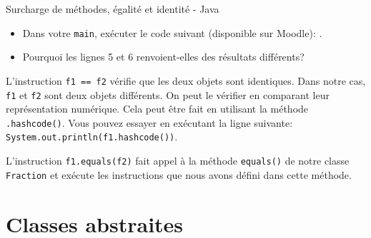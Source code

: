 \begin{Exercice}[30 minutes]{Surcharge de méthodes, égalité et identité - Java}
\begin{itemize}
	\begin{conseil}
		En Java, pour vérifier que deux objets sont de même type, vous pouvez accéder à la classe de chacun des éléments en utilisant la méthode \lstinline{.getClass())} et les comparer.
	\end{conseil}
	\item Dans votre \lstinline{main}, exécuter le code suivant (disponible sur Moodle): 
	.
	\item Pourquoi les lignes 5 et 6 renvoient-elles des résultats différents?	
\end{itemize}

\begin{solution}
	

	L'instruction \lstinline{f1 == f2} vérifie que les deux objets sont identiques. Dans notre cas, \lstinline{f1} et \lstinline{f2} sont deux objets différents. On peut le vérifier en comparant leur représentation numérique. Cela peut être fait en utilisant la méthode \lstinline{.hashcode()}. Vous pouvez essayer en exécutant la ligne suivante: \lstinline{System.out.println(f1.hashcode())}.

	L'instruction \lstinline{f1.equals(f2)} fait appel à la méthode \lstinline{equals()} de notre classe \lstinline{Fraction} et exécute les instructions que nous avons défini dans cette méthode.
\end{solution}





\end{Exercice}
	

\section{Classes abstraites}

